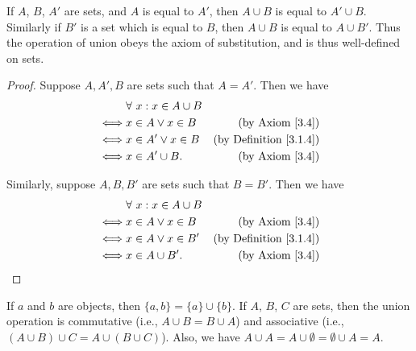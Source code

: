 \setcounter{theorem}{11}
\begin{remark}\label{3.1.12}
    If \(A\), \(B\), \(A'\) are sets, and \(A\) is equal to \(A'\), then \(A \cup B\) is equal to \(A' \cup B\).
    Similarly if \(B'\) is a set which is equal to \(B\), then \(A \cup B\) is equal to \(A \cup B'\).
    Thus the operation of union obeys the axiom of substitution, and is thus well-defined on sets.
\end{remark}

\begin{proof}
    Suppose \(A, A', B\) are sets such that \(A = A'\).
    Then we have
    \begin{align*}
             & \forall\ x : x \in A \cup B                                      \\
        \iff & x \in A \lor x \in B        & \text{(by Axiom \ref{3.4})}        \\
        \iff & x \in A' \lor x \in B       & \text{(by Definition \ref{3.1.4})} \\
        \iff & x \in A' \cup B.            & \text{(by Axiom \ref{3.4})}
    \end{align*}

    Similarly, suppose \(A, B, B'\) are sets such that \(B = B'\).
    Then we have
    \begin{align*}
             & \forall\ x : x \in A \cup B                                      \\
        \iff & x \in A \lor x \in B        & \text{(by Axiom \ref{3.4})}        \\
        \iff & x \in A \lor x \in B'       & \text{(by Definition \ref{3.1.4})} \\
        \iff & x \in A \cup B'.            & \text{(by Axiom \ref{3.4})}
    \end{align*}
\end{proof}

\begin{lemma}\label{3.1.13}
    If \(a\) and \(b\) are objects, then \(\{a, b\} = \{a\} \cup \{b\}\).
    If \(A\), \(B\), \(C\) are sets, then the union operation is commutative (i.e., \(A \cup B = B \cup A\)) and associative (i.e., \((A \cup B) \cup C = A \cup (B \cup C)\)).
    Also, we have \(A \cup A = A \cup \emptyset = \emptyset \cup A = A\).
\end{lemma}


